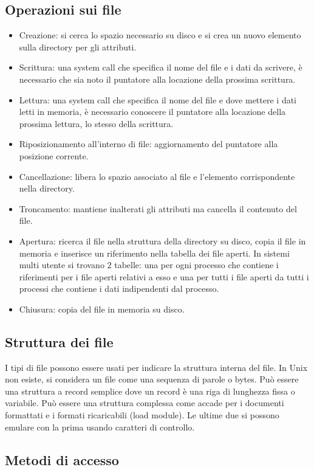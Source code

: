 \subsection{Operazioni sui file}
\begin{itemize}
	\item Creazione: si cerca lo spazio necessario su disco e si crea un nuovo elemento sulla directory per gli attributi.
	\item Scrittura: una system call che specifica il nome del file e i dati da scrivere, \`e necessario che sia noto il puntatore alla locazione della prossima scrittura.
	\item Lettura: una system call che specifica il nome del file e dove mettere i dati letti in memoria, \`e necessario conoscere il puntatore alla locazione della prossima
		lettura, lo stesso della scrittura. 
	\item Riposizionamento all'interno di file: aggiornamento del puntatore alla posizione corrente.
	\item Cancellazione: libera lo spazio associato al file e l'elemento corrispondente nella directory. 
	\item Troncamento: mantiene inalterati gli attributi ma cancella il contenuto del file. 
	\item Apertura: ricerca il file nella struttura della directory su disco, copia il file in memoria e inserisce un riferimento nella tabella dei file aperti. In sistemi 
		multi utente si trovano $2$ tabelle: una per ogni processo che contiene i riferimenti per i file aperti relativi a esso e una per tutti i file aperti da tutti i 
		processi che contiene i dati indipendenti dal processo. 
	\item Chiusura: copia del file in memoria su disco. 
\end{itemize}
\subsection{Struttura dei file}
I tipi di file possono essere usati per indicare la struttura interna del file. In Unix non esiste, si considera un file come una sequenza di parole o bytes. Pu\`o essere una struttura a 
record semplice dove un record \`e una riga di lunghezza fissa o variabile. Pu\`o essere una struttura complessa come accade per i documenti formattati e i formati ricaricabili (load
module). Le ultime due si possono emulare con la prima usando caratteri di controllo. 
\subsection{Metodi di accesso}
